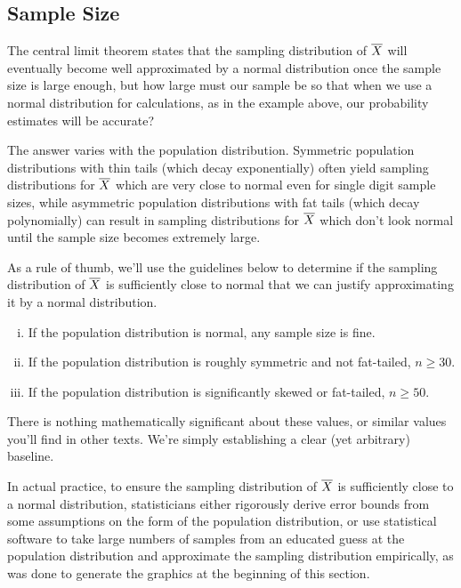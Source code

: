 \subsection*{Sample Size}

The central limit theorem states that the sampling distribution of ${\overline{X}}$ will eventually become well approximated by a normal distribution once the sample size is large enough, but how large must our sample be so that when we use a normal distribution for calculations, as in the example above, our probability estimates will be accurate?
\par
The answer varies with the population distribution. Symmetric population distributions with thin tails (which decay exponentially) often yield sampling distributions for ${\overline{X}}$ which are very close to normal even for single digit sample sizes, while asymmetric population distributions with fat tails (which decay polynomially) can result in sampling distributions for ${\overline{X}}$ which don't look normal until the sample size becomes extremely large.
\par
As a rule of thumb, we'll use the guidelines below to determine if the sampling distribution of ${\overline{X}}$ is sufficiently close to normal that we can justify approximating it by a normal distribution.
\vspace{-0.5em}
\begin{enumerate}[(i)]
\item If the population distribution is normal, any sample size is fine.
\item If the population distribution is roughly symmetric and not fat-tailed, $n \geq 30$.
\item If the population distribution is significantly skewed or fat-tailed, $n \geq 50$.
\end{enumerate}
\par
There is nothing mathematically significant about these values, or similar values you'll find in other texts. We're simply establishing a clear (yet arbitrary) baseline. 
\par
In actual practice, to ensure the sampling distribution of ${\overline{X}}$ is sufficiently close to a normal distribution, statisticians either rigorously derive error bounds from some assumptions on the form of the population distribution, or use statistical software to take large numbers of samples from an educated guess at the population distribution and approximate the sampling distribution empirically, as was done to generate the graphics at the beginning of this section.
